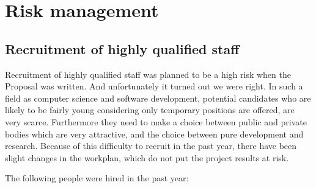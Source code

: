 \documentclass{deliverablereport}
\begin{document}
\section{Risk management}
\subsection{Recruitment of highly qualified staff}
Recruitment of highly qualified staff was planned to be a high risk
when the Proposal was written. And unfortunately it turned out we were
right. In such a field as computer science and software development,
potential candidates who are likely to be fairly young considering
only temporary positions are offered, are very scarce. Furthermore
they need to make a choice between public and private bodies which are
very attractive, and the choice between pure development and research.
Because of this difficulty to recruit in the past year, there have
been slight changes in the workplan, which do
not put the project results at risk.

The following people were hired in the past year:\\
\end{document}
